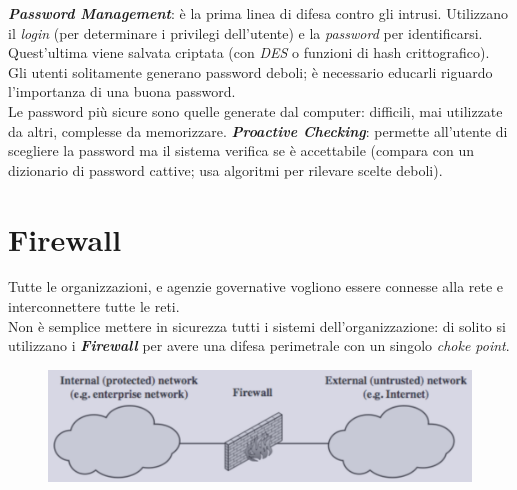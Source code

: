 \documentclass[11pt, a4paper, twoside, italian]{report}
\theoremstyle{plain}
\begin{document}
\noindent
\textit{\textbf{Password Management}}: è la prima linea di difesa contro gli intrusi. Utilizzano il \textit{login} (per determinare i privilegi dell'utente) e la \textit{password} per identificarsi. Quest'ultima viene salvata criptata (con \textit{DES} o funzioni di hash crittografico).\\
Gli utenti solitamente generano password deboli; è necessario educarli riguardo l'importanza di una buona password.\\
Le password più sicure sono quelle generate dal computer: difficili, mai utilizzate da altri, complesse da memorizzare.
\textit{\textbf{Proactive Checking}}: permette all'utente di scegliere la password ma il sistema verifica se è accettabile (compara con un dizionario di password cattive; usa algoritmi per rilevare scelte deboli).



\chapter*{Firewall}
\begin{multicols}{2}
	\noindent
	Tutte le organizzazioni, e agenzie governative vogliono essere connesse alla rete e interconnettere tutte le reti.\\
	Non è semplice mettere in sicurezza tutti i sistemi dell'organizzazione: di solito si utilizzano i \textit{\textbf{Firewall}} per avere una difesa perimetrale con un singolo \textit{choke point}.
\columnbreak
	\begin{figure}[H]
		\centering
		\includegraphics[scale=0.52]{firewall}
	\end{figure}
\end{multicols}
\end{document}
